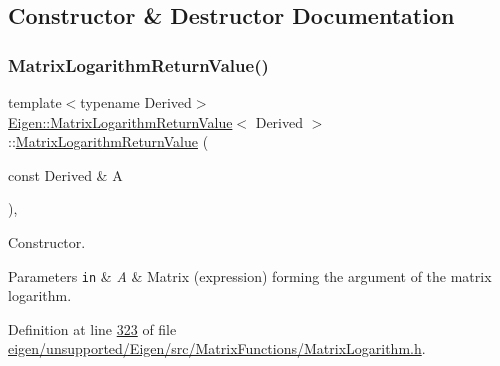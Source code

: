\subsection{Constructor \& Destructor Documentation}
\mbox{\label{class_eigen_1_1_matrix_logarithm_return_value_adfd2417a3d6f671e156b4ab1b92f1837}} 
\subsubsection{\texorpdfstring{Matrix\+Logarithm\+Return\+Value()}{MatrixLogarithmReturnValue()}\hspace{0.1cm}{\footnotesize\ttfamily [1/2]}}
{\footnotesize\ttfamily template$<$typename Derived$>$ \\
\hyperlink{class_eigen_1_1_matrix_logarithm_return_value}{Eigen\+::\+Matrix\+Logarithm\+Return\+Value}$<$ Derived $>$\+::\hyperlink{class_eigen_1_1_matrix_logarithm_return_value}{Matrix\+Logarithm\+Return\+Value} (\begin{DoxyParamCaption}\item[{const Derived \&}]{A }\end{DoxyParamCaption})\hspace{0.3cm}{\ttfamily [inline]}, {\ttfamily [explicit]}}



Constructor. 


\begin{DoxyParams}[1]{Parameters}
\mbox{\tt in}  & {\em A} & Matrix (expression) forming the argument of the matrix logarithm. \\
\hline
\end{DoxyParams}


Definition at line \hyperlink{eigen_2unsupported_2_eigen_2src_2_matrix_functions_2_matrix_logarithm_8h_source_l00323}{323} of file \hyperlink{eigen_2unsupported_2_eigen_2src_2_matrix_functions_2_matrix_logarithm_8h_source}{eigen/unsupported/\+Eigen/src/\+Matrix\+Functions/\+Matrix\+Logarithm.\+h}.

\mbox{\label{class_eigen_1_1_matrix_logarithm_return_value_adfd2417a3d6f671e156b4ab1b92f1837}} 
